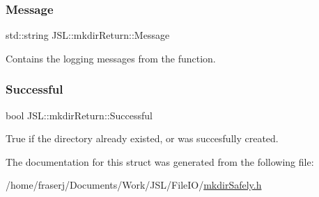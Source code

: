 \subsubsection{\texorpdfstring{Message}{Message}}
{\footnotesize\ttfamily std\+::string J\+S\+L\+::mkdir\+Return\+::\+Message}



Contains the logging messages from the function. 

\mbox{\label{structJSL_1_1mkdirReturn_a76abe5af61a20e13756f833b79782b7f}} 
\subsubsection{\texorpdfstring{Successful}{Successful}}
{\footnotesize\ttfamily bool J\+S\+L\+::mkdir\+Return\+::\+Successful}



True if the directory already existed, or was succesfully created. 



The documentation for this struct was generated from the following file\+:\begin{DoxyCompactItemize}
\item 
/home/fraserj/\+Documents/\+Work/\+J\+S\+L/\+File\+I\+O/\hyperlink{mkdirSafely_8h}{mkdir\+Safely.\+h}\end{DoxyCompactItemize}
